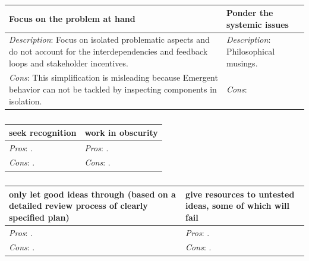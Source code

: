\begin{center}
\begin{table}[ht]
\begin{tabular}{ | m{\dilemmatablewidth}| m{\dilemmatablewidth} | } 
  \hline
  \textbf{Focus on the problem at hand} &
  \textbf{Ponder the systemic issues} \\
  \hline
  \textit{Description}: Focus on isolated problematic aspects and do not account for the interdependencies and feedback loops and stakeholder incentives. &
  \textit{Description}: Philosophical musings. \\
  \hline
  \textit{Cons}: This simplification is misleading because Emergent behavior can not be tackled by inspecting components in isolation. & 
  \textit{Cons}: \\
  \hline
\end{tabular}
\caption{
}
\label{table:focus-vs-systemic}
\end{table}
\end{center}

\begin{center}
\begin{table}[ht]
\begin{tabular}{ | m{\dilemmatablewidth}| m{\dilemmatablewidth} | } 
  \hline
  \textbf{seek recognition} &
  \textbf{work in obscurity} \\
  \hline
  \textit{Pros}: . & 
  \textit{Pros}: . \\
  \hline
  \textit{Cons}: . & 
  \textit{Cons}: . \\
  \hline
\end{tabular}
\caption{
}
\label{table:recognition-obscurity}
\end{table}
\end{center}

\begin{center}
\begin{table}[ht]
\begin{tabular}{ | m{\dilemmatablewidth}| m{\dilemmatablewidth} | } 
  \hline
  \textbf{only let good ideas through (based on a detailed review process of clearly specified plan)} &
  \textbf{give resources to untested ideas, some of which will fail} \\
  \hline
  \textit{Pros}: . & 
  \textit{Pros}: . \\
  \hline
  \textit{Cons}: . & 
  \textit{Cons}: . \\
  \hline
\end{tabular}
\caption{
}
\label{table:idea-filtering}
\end{table}
\end{center}


